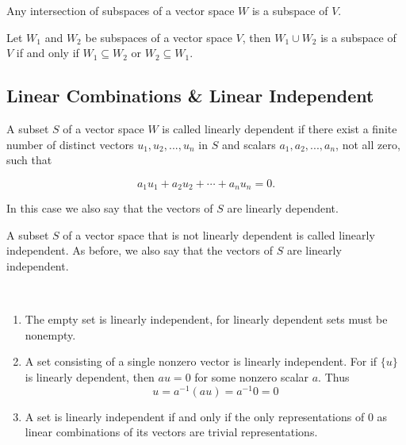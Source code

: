 \begin{tcolorbox}
	\begin{thm} %
 Any intersection of subspaces of a vector space $W$ is a subspace of $V$.
\end{thm}


\begin{thm} %
	Let $W_1$ and $W_2$ be subspaces of a vector space $V$, then $W_1 \cup W_2$ is a subspace of $V$ if and only if $W_1 \subseteq W_2$ or $W_2 \subseteq W_1$. 
\end{thm}
\pfshow{}
\end{tcolorbox}


\subsection{Linear Combinations \& Linear Independent}

\begin{defn}
	
\end{defn}

\begin{defn}
	A subset $S$ of a vector space $W$ is called linearly dependent if there exist a finite number of distinct vectors $u_1, u_2, . . . , u_n$ in $S$ and scalars $a_1,a_2,...,a_n$, not all zero, such that 
	
		$$a_1u_1 + a_2u_2 +\cdots +a_nu_n = 0 .$$
	
In this case we also say that the vectors of $S$ are linearly dependent.

\end{defn}

\begin{defn}
	A subset $S$ of a vector space that is not linearly dependent is called linearly independent. As before, we also say that the vectors of $S$ are linearly independent.
\end{defn}

\begin{rmk*}$ $
	\begin{enumerate}
		\item The empty set is linearly independent, for linearly dependent sets must be nonempty.
		\item A set consisting of a single nonzero vector is linearly independent. For if $\{u\}$ is linearly dependent, then $au = 0$ for some nonzero scalar $a$. Thus
			$$ u = a^{-1}(au) = a^{-1} 0 = 0 $$
		\item A set is linearly independent if and only if the only representations of $0$ as linear combinations of its vectors are trivial representations.
	\end{enumerate}
\end{rmk*}

